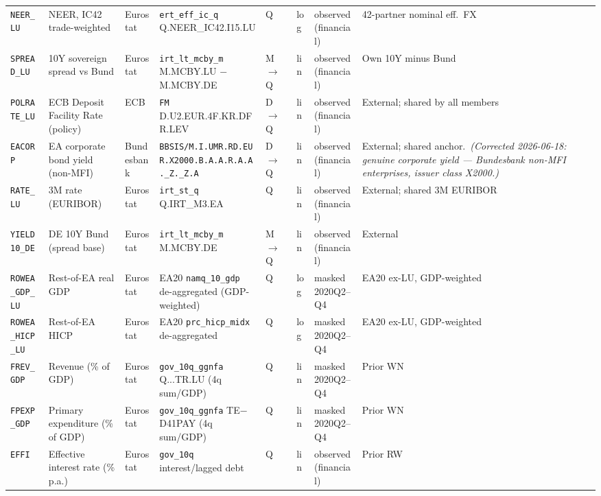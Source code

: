 {\begin{longtable}{@{}p{1.9cm}p{2.9cm}p{1.5cm}p{2.7cm}p{0.7cm}p{1.0cm}p{1.6cm}p{2.4cm}@{}}
\texttt{NEER\_LU}     & NEER, IC42 trade-weighted         & Eurostat & \texttt{ert\_eff\_ic\_q} Q.NEER\_IC42.I15.LU           & Q & log & observed (financial) & 42-partner nominal eff.\ FX \\
\texttt{SPREAD\_LU}   & 10Y sovereign spread vs Bund      & Eurostat & \texttt{irt\_lt\_mcby\_m} M.MCBY.LU $-$ M.MCBY.DE      & M$\to$Q & lin & observed (financial) & Own 10Y minus Bund \\
\texttt{POLRATE\_LU}  & ECB Deposit Facility Rate (policy) & ECB & \texttt{FM} D.\allowbreak U2.\allowbreak EUR.\allowbreak 4F.\allowbreak KR.\allowbreak DFR.\allowbreak LEV                     & D$\to$Q & lin & observed (financial) & External; shared by all members \\
\texttt{EACORP}       & EA corporate bond yield (non-MFI)  & Bundesbank & \texttt{BBSIS/\allowbreak M.\allowbreak I.\allowbreak UMR.\allowbreak RD.\allowbreak EUR.\allowbreak X2000.\allowbreak B.A.A.\allowbreak R.A.A.\allowbreak \_Z.\_Z.A}       & D$\to$Q & lin & observed (financial) & External; shared anchor.\ \textit{(Corrected 2026-06-18: genuine corporate yield --- Bundesbank non-MFI enterprises, issuer class X2000.)} \\
\texttt{RATE\_LU}     & 3M rate (EURIBOR)                 & Eurostat & \texttt{irt\_st\_q} Q.IRT\_M3.EA                       & Q & lin & observed (financial) & External; shared 3M EURIBOR \\
\texttt{YIELD10\_DE}  & DE 10Y Bund (spread base)         & Eurostat & \texttt{irt\_lt\_mcby\_m} M.MCBY.DE                    & M$\to$Q & lin & observed (financial) & External \\
\texttt{ROWEA\_GDP\_LU} & Rest-of-EA real GDP             & Eurostat & EA20 \texttt{namq\_10\_gdp} de-aggregated (GDP-weighted) & Q & log & masked 2020Q2--Q4 & EA20 ex-LU, GDP-weighted \\
\texttt{ROWEA\_HICP\_LU} & Rest-of-EA HICP               & Eurostat & EA20 \texttt{prc\_hicp\_midx} de-aggregated            & Q & log & masked 2020Q2--Q4 & EA20 ex-LU, GDP-weighted \\
\texttt{FREV\_GDP}    & Revenue (\% of GDP)               & Eurostat & \texttt{gov\_10q\_ggnfa} Q...TR.LU (4q sum/GDP)        & Q & lin & masked 2020Q2--Q4 & Prior WN \\
\texttt{FPEXP\_GDP}   & Primary expenditure (\% of GDP)   & Eurostat & \texttt{gov\_10q\_ggnfa} TE$-$D41PAY (4q sum/GDP)      & Q & lin & masked 2020Q2--Q4 & Prior WN \\
\texttt{EFFI}         & Effective interest rate (\% p.a.) & Eurostat & \texttt{gov\_10q} interest/lagged debt                 & Q & lin & observed (financial) & Prior RW \\

\end{longtable}}
